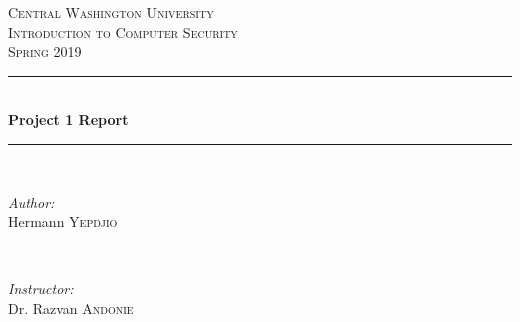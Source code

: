 \documentclass[12pt]{article}
\begin{document}
	
	\begin{titlepage}
		
		\newcommand{\HRule}{\rule{\linewidth}{0.5mm}} %
		
		\center %
		
		
		\textsc{\LARGE Central Washington University}\\[1.5cm] %
		\textsc{\Large Introduction to Computer Security}\\[0.5cm] %
		\textsc{\large Spring 2019}\\[0.5cm] %
		
		
		\HRule \\[0.4cm]
		{ \huge \bfseries Project 1 Report}\\[0.4cm] %
		\HRule \\[1.5cm]
		
		
		\begin{minipage}{0.4\textwidth}
			\begin{flushleft} \large
				\emph{Author:}\\
				Hermann \textsc{Yepdjio} %
			\end{flushleft}
		\end{minipage}
		~
		\begin{minipage}{0.4\textwidth}
			\begin{flushright} \large
				\emph{Instructor:} \\
				Dr. Razvan \textsc{Andonie} %
			\end{flushright}
		\end{minipage}\\[1cm]
		

\end{titlepage}
\end{document}

